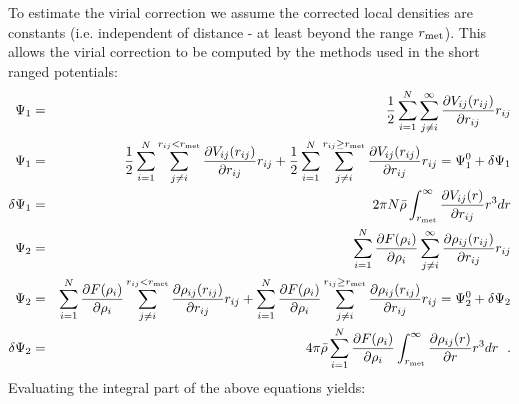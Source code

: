 To estimate the virial correction we assume the corrected local
densities are constants (i.e. independent of distance - at least
beyond the range $r_{\rm met}$).  This allows the virial correction to
be computed by the methods used in the short ranged potentials:
\begin{eqnarray}
\Psi_{1} &=& {1 \over 2} \sum_{i=1}^{N} \sum_{j \ne i}^{\infty}
\frac{\partial V_{ij}(r_{ij})}{\partial r_{ij}} r_{ij} \nonumber \\
\Psi_{1} &=& {1 \over 2} \sum_{i=1}^{N} \sum_{j \ne i}^{r_{ij}<r_{\rm met}}
\frac{\partial V_{ij}(r_{ij})}{\partial r_{ij}} r_{ij} +
{1 \over 2} \sum_{i=1}^{N} \sum_{j \ne i}^{r_{ij} \ge r_{\rm met}}
\frac{\partial V_{ij}(r_{ij})}{\partial r_{ij}} r_{ij} = \Psi_{1}^{0} + \delta \Psi_{1} \nonumber \\
\delta \Psi_{1} &=& 2 \pi N \bar{\rho} \int_{r_{\rm met}}^{\infty}
\frac{\partial V_{ij}(r)}{\partial r_{ij}} r^{3} dr \nonumber \\
\Psi_{2} &=& \sum_{i=1}^{N} \frac{\partial F(\rho_{i})}{\partial \rho_{i}}
\sum_{j \ne i}^{\infty} \frac{\partial \rho_{ij}(r_{ij})}{\partial r_{ij}} r_{ij} \\
\Psi_{2} &=& \sum_{i=1}^{N} \frac{\partial F(\rho_{i})}{\partial \rho_{i}}
\sum_{j \ne i}^{r_{ij}<r_{\rm met}} \frac{\partial \rho_{ij}(r_{ij})}{\partial r_{ij}} r_{ij} +
\sum_{i=1}^{N} \frac{\partial F(\rho_{i})}{\partial \rho_{i}}
\sum_{j \ne i}^{r_{ij} \ge r_{\rm met}} \frac{\partial \rho_{ij}(r_{ij})}{\partial r_{ij}} r_{ij} = \Psi_{2}^{0} + \delta \Psi_{2} \nonumber \\
\delta \Psi_{2} &=& 4 \pi \bar{\rho} \sum_{i=1}^{N} \frac{\partial F(\rho_{i})}{\partial \rho_{i}}
\int_{r_{\rm met}}^{\infty} \frac{\partial \rho_{ij}(r)}{\partial r} r^{3} dr~~. \nonumber
\end{eqnarray}
Evaluating the integral part of the above equations yields:
